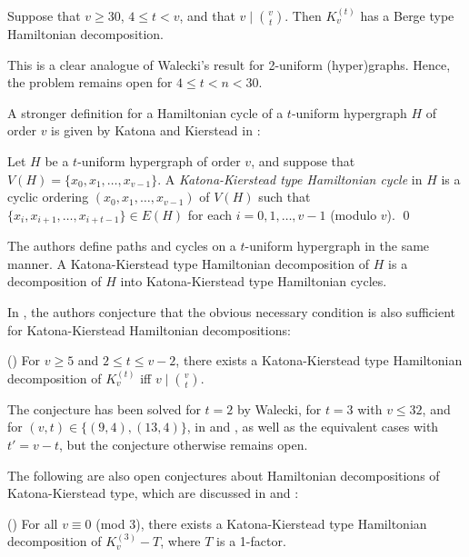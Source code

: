 \begin{theorem} \label{berge-hamilton2}
Suppose that $v \geq 30$, $4 \leq t < v$, and that $v \mid {v \choose t}$. Then
$K_v^{(t)}$ has a Berge type Hamiltonian decomposition.
\end{theorem}

This is a clear analogue of Walecki's result for 2-uniform (hyper)graphs.
Hence, the problem remains open for $4 \leq t < n < 30$.

A stronger definition for a Hamiltonian cycle of a $t$-uniform hypergraph $H$ of
order $v$ is given by Katona and Kierstead in \cite{kato-kier}:

\begin{definition}
Let $H$ be a $t$-uniform hypergraph of order $v$, and suppose that $V(H) =
\{x_0, x_1, \ldots, x_{v-1}\}$.
A {\em Katona-Kierstead type Hamiltonian cycle} in $H$ is a cyclic ordering
$(x_0, x_1, \ldots, x_{v-1})$ of $V(H)$
such that $\{x_i, x_{i+1}, \ldots, x_{i+t-1}\} \in E(H)$ for each $i =
0,1,\ldots,v-1$ (modulo $v$).
\qed
\end{definition}

The authors define paths and cycles on a $t$-uniform hypergraph in the same
manner.
A Katona-Kierstead type Hamiltonian decomposition of $H$ is a decomposition of
$H$ into Katona-Kierstead type Hamiltonian cycles.

In \cite{bail-stev}, the authors conjecture that the obvious necessary
condition is also sufficient for Katona-Kierstead Hamiltonian decompositions:

\begin{conjecture} \label{bailey-stevens} (\cite{bail-stev})
For $v \geq 5$ and $2 \leq t \leq v-2$, there exists a Katona-Kierstead type
Hamiltonian decomposition of $K_{v}^{(t)}$ iff $v \mid {v \choose t}$.
\end{conjecture}

The conjecture has been solved for $t = 2$ by Walecki, for $t=3$ with $v \leq
32$, and for $(v, t) \in \{(9,4),(13,4)\}$, in \cite{bail-stev} and
\cite{mesz-rosa}, as well as the equivalent cases with $t' = v-t$, but
the conjecture otherwise remains open.

The following are also open conjectures about Hamiltonian decompositions of
Katona-Kierstead type, which are discussed in \cite{mesz-rosa} and
\cite{kuhl-schr}:

\begin{conjecture} (\cite{mesz-rosa})
For all $v \equiv 0$ (mod $3$), there exists a Katona-Kierstead type
Hamiltonian decomposition of $K_v^{(3)} - T$, where $T$ is a 1-factor.
\end{conjecture}

